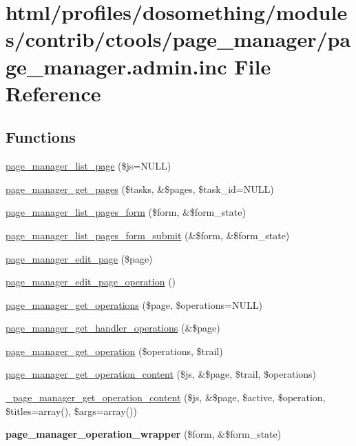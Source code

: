 \hypertarget{page__manager_8admin_8inc}{
\section{html/profiles/dosomething/modules/contrib/ctools/page\_\-manager/page\_\-manager.admin.inc File Reference}
\label{page__manager_8admin_8inc}
}
\subsection*{Functions}
\begin{DoxyCompactItemize}
\item 
\hyperlink{page__manager_8admin_8inc_a4366f90c2f82cba288c4c41e98dc51aa}{page\_\-manager\_\-list\_\-page} (\$js=NULL)
\item 
\hyperlink{page__manager_8admin_8inc_a1dd523dbb3fdf5808af244fe67d95776}{page\_\-manager\_\-get\_\-pages} (\$tasks, \&\$pages, \$task\_\-id=NULL)
\item 
\hyperlink{page__manager_8admin_8inc_a69d5a1c5ff1ecf2d5b566dfaeeb2ae54}{page\_\-manager\_\-list\_\-pages\_\-form} (\$form, \&\$form\_\-state)
\item 
\hyperlink{page__manager_8admin_8inc_a148b43b1d53e788722edc7f8f1c8dc76}{page\_\-manager\_\-list\_\-pages\_\-form\_\-submit} (\&\$form, \&\$form\_\-state)
\item 
\hyperlink{page__manager_8admin_8inc_aabc0ee81d4ff6bb8566ff3d67ff74798}{page\_\-manager\_\-edit\_\-page} (\$page)
\item 
\hyperlink{page__manager_8admin_8inc_a88fc713de52b4be208360499f8225ac1}{page\_\-manager\_\-edit\_\-page\_\-operation} ()
\item 
\hyperlink{page__manager_8admin_8inc_a660bf3462704812598b7af309477ac25}{page\_\-manager\_\-get\_\-operations} (\$page, \$operations=NULL)
\item 
\hyperlink{page__manager_8admin_8inc_ac5ec1413c03ea5e18480ba053b13295a}{page\_\-manager\_\-get\_\-handler\_\-operations} (\&\$page)
\item 
\hyperlink{page__manager_8admin_8inc_a92cff2e11d6dd0661ecc4f39cf57babf}{page\_\-manager\_\-get\_\-operation} (\$operations, \$trail)
\item 
\hyperlink{page__manager_8admin_8inc_a0e89fcc896c6d44a4b0559439d4a9689}{page\_\-manager\_\-get\_\-operation\_\-content} (\$js, \&\$page, \$trail, \$operations)
\item 
\hyperlink{page__manager_8admin_8inc_aa379143ef5ed68cc40f2a6dac3c5d456}{\_\-page\_\-manager\_\-get\_\-operation\_\-content} (\$js, \&\$page, \$active, \$operation, \$titles=array(), \$args=array())
\item 
\hypertarget{page__manager_8admin_8inc_ad205a90000dc004686cb26e4c85b63ee}{
{\bfseries page\_\-manager\_\-operation\_\-wrapper} (\$form, \&\$form\_\-state)}
\label{page__manager_8admin_8inc_ad205a90000dc004686cb26e4c85b63ee}


\end{DoxyCompactItemize}
